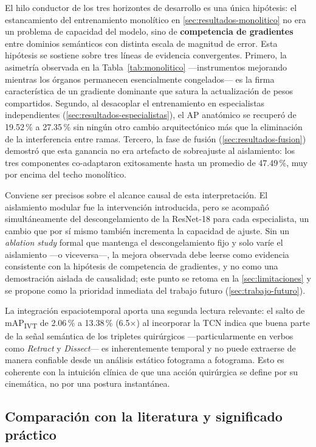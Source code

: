 \documentclass[11pt]{article}
\begin{document}
El hilo conductor de los tres horizontes de desarrollo es una única hipótesis: el estancamiento del entrenamiento monolítico en \cref{sec:resultados-monolitico} no era un problema de capacidad del modelo, sino de \textbf{competencia de gradientes} entre dominios semánticos con distinta escala de magnitud de error. Esta hipótesis se sostiene sobre tres líneas de evidencia convergentes. Primero, la asimetría observada en la Tabla~\ref{tab:monolitico} —instrumentos mejorando mientras los órganos permanecen esencialmente congelados— es la firma característica de un gradiente dominante que satura la actualización de pesos compartidos. Segundo, al desacoplar el entrenamiento en especialistas independientes (\cref{sec:resultados-especialistas}), el AP anatómico se recuperó de 19.52\,\% a 27.35\,\% sin ningún otro cambio arquitectónico más que la eliminación de la interferencia entre ramas. Tercero, la fase de fusión (\cref{sec:resultados-fusion}) demostró que esta ganancia no era artefacto de sobreajuste al aislamiento: los tres componentes co-adaptaron exitosamente hasta un promedio de 47.49\,\%, muy por encima del techo monolítico.

Conviene ser precisos sobre el alcance causal de esta interpretación. El aislamiento modular fue la intervención introducida, pero se acompañó simultáneamente del descongelamiento de la ResNet-18 para cada especialista, un cambio que por sí mismo también incrementa la capacidad de ajuste. Sin un \emph{ablation study} formal que mantenga el descongelamiento fijo y solo varíe el aislamiento —o viceversa—, la mejora observada debe leerse como evidencia consistente con la hipótesis de competencia de gradientes, y no como una demostración aislada de causalidad; este punto se retoma en la \cref{sec:limitaciones} y se propone como la prioridad inmediata del trabajo futuro (\cref{sec:trabajo-futuro}).

La integración espaciotemporal aporta una segunda lectura relevante: el salto de mAP\textsubscript{IVT} de 2.06\,\% a 13.38\,\% (6.5$\times$) al incorporar la TCN indica que buena parte de la señal semántica de los tripletes quirúrgicos —particularmente en verbos como \emph{Retract} y \emph{Dissect}— es inherentemente temporal y no puede extraerse de manera confiable desde un análisis estático fotograma a fotograma. Esto es coherente con la intuición clínica de que una acción quirúrgica se define por su cinemática, no por una postura instantánea.

\subsection{Comparación con la literatura y significado práctico}
\label{sec:comparacion-literatura}
\end{document}
